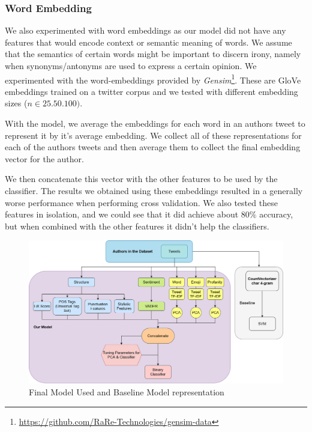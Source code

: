 

    \subsubsection{Word Embedding}
        We also experimented with word embeddings as our model did not have any features that would encode context or semantic meaning of words. We assume that the semantics of certain words might be important to discern irony, namely when synonyms/antonyms are used to express a certain opinion.
        We experimented with the word-embeddings provided by \emph{Gensim}\footnote{\url{https://github.com/RaRe-Technologies/gensim-data}}. These are GloVe embeddings trained on a twitter corpus and we tested with different embedding sizes ($n \in {25.50.100})$.
        
        With the model, we average the embeddings for each word in an authors tweet to represent it by it's average embedding. We collect all of these representations for each of the authors tweets and then average them to collect the final embedding vector for the author.
        
        We then concatenate this vector with the other features to be used by the classifier. The results we obtained using these embeddings resulted in a generally worse performance when performing cross validation. We also tested these features in isolation, and we could see that it did achieve about $80\%$ accuracy, but when combined with the other features it didn't help the classifiers.
      \begin{figure}[!h]
        \centering
        \includegraphics[width = \textwidth]{images/lang_proc.png}
        \caption{Final Model Used and Baseline Model representation}
        \label{fig:model_representation}
    \end{figure}      
